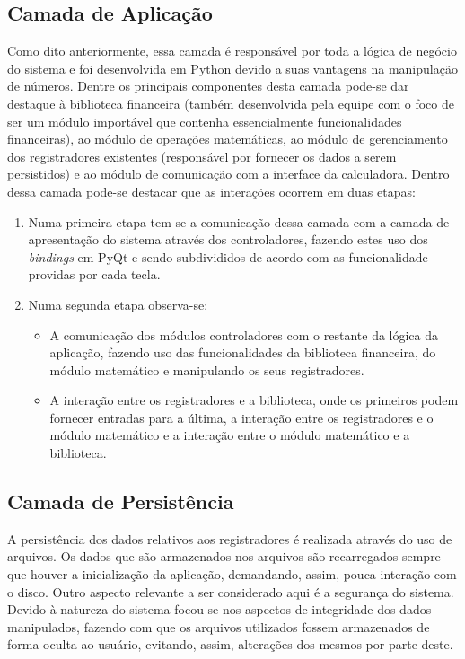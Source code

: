 \subsection{Camada de Aplicação}
Como dito anteriormente, essa camada é responsável por toda a lógica de negócio do sistema e foi desenvolvida em Python devido a suas vantagens na manipulação de números.
Dentre os principais componentes desta camada pode-se dar destaque à biblioteca financeira (também desenvolvida pela equipe com o foco de ser um módulo importável que contenha essencialmente funcionalidades financeiras), ao módulo de operações matemáticas, ao módulo de gerenciamento dos registradores existentes (responsável por fornecer os dados a serem persistidos) e ao módulo de comunicação com a interface da calculadora.
 Dentro dessa camada pode-se destacar que as interações ocorrem em duas etapas:
\begin{enumerate}
 \item Numa primeira etapa tem-se a comunicação dessa camada com a camada de apresentação do sistema através dos controladores, fazendo estes uso dos \textit{bindings} em PyQt e sendo subdivididos de acordo com as funcionalidade providas por cada tecla.
 \item Numa segunda etapa observa-se:	
 \begin{itemize}
    \item A comunicação dos módulos controladores com o restante da lógica da aplicação, fazendo uso das funcionalidades da biblioteca financeira, do módulo matemático e manipulando os seus registradores.
    \item A interação entre os registradores e a biblioteca, onde os primeiros podem fornecer entradas para a última, a interação entre os registradores e o módulo matemático e a interação entre o módulo matemático e a biblioteca.
 \end{itemize}
\end{enumerate}

\subsection{Camada de Persistência}
A persistência dos dados relativos aos registradores é realizada através do uso de arquivos. Os dados que são armazenados nos arquivos são recarregados sempre que houver a inicialização da aplicação, demandando, assim, pouca interação com o disco.
Outro aspecto relevante a ser considerado aqui é a segurança do sistema.  Devido à natureza do sistema focou-se nos aspectos de integridade dos dados manipulados, fazendo com que os arquivos utilizados fossem armazenados de forma oculta ao usuário, evitando, assim, alterações dos mesmos por parte deste.

